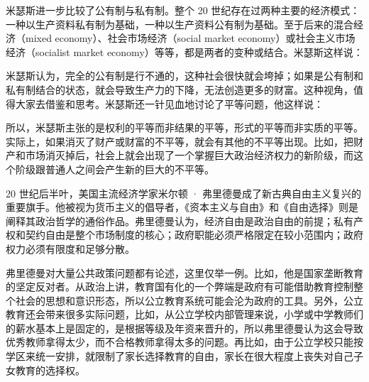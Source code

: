 米瑟斯进一步比较了公有制与私有制。整个 20 世纪存在过两种主要的经济模式：一种以生产资料私有制为基础，一种以生产资料公有制为基础。至于后来的混合经济（mixed economy）、社会市场经济（social market economy）或社会主义市场经济（socialist market economy）等等，都是两者的变种或结合。米瑟斯这样说：


米瑟斯认为，完全的公有制是行不通的，这种社会很快就会垮掉；如果是公有制和私有制结合的状态，就会导致生产力的下降，无法创造更多的财富。这种视角，值得大家去借鉴和思考。米瑟斯还一针见血地讨论了平等问题，他这样说：


所以，米瑟斯主张的是权利的平等而非结果的平等，形式的平等而非实质的平等。实际上，如果消灭了财产或财富的不平等，就会有其他的不平等出现。比如，把财产和市场消灭掉后，社会上就会出现了一个掌握巨大政治经济权力的新阶级，而这个阶级跟普通人之间会产生新的巨大的不平等。

20 世纪后半叶，美国主流经济学家米尔顿 · 弗里德曼成了新古典自由主义复兴的重要旗手。他被视为货币主义的倡导者，《资本主义与自由》和《自由选择》则是阐释其政治哲学的通俗作品。弗里德曼认为，经济自由是政治自由的前提；私有产权和契约自由是整个市场制度的核心；政府职能必须严格限定在较小范围内；政府权力必须有限度和足够分散。

弗里德曼对大量公共政策问题都有论述，这里仅举一例。比如，他是国家垄断教育的坚定反对者。从政治上讲，教育国有化的一个弊端是政府有可能借助教育控制整个社会的思想和意识形态，所以公立教育系统可能会沦为政府的工具。另外，公立教育还会带来很多实际问题，比如，从公立学校内部管理来说，小学或中学教师们的薪水基本上是固定的，是根据等级及年资来晋升的，所以弗里德曼认为这会导致优秀教师拿得太少，而不合格教师拿得太多的问题。再比如，由于公立学校只能按学区来统一安排，就限制了家长选择教育的自由，家长在很大程度上丧失对自己子女教育的选择权。

